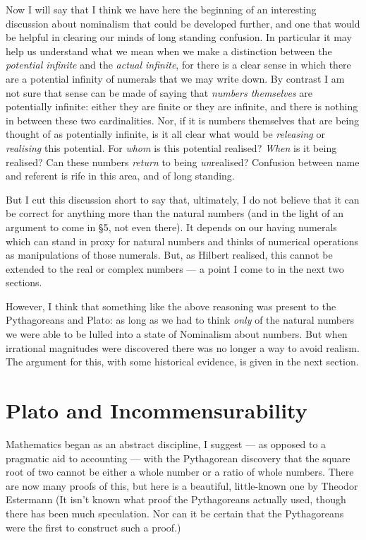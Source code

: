 \documentclass[11pt,oneside,a4paper]{article}
\begin{document}
Now I will say that I think we have here the beginning of an interesting discussion about nominalism that could be developed further, and one that would be helpful in clearing our minds of long standing confusion. In particular it may help us understand what we mean when we make a distinction between the \textit{potential infinite} and the \textit{actual infinite}, for there is a clear sense in which there are a potential infinity of numerals that we may write down. By contrast I am not sure that sense can be made of saying that \textit{numbers themselves} are potentially infinite: either they are finite or they are infinite, and there is nothing in between these two cardinalities. Nor, if it is numbers themselves that are being thought of as potentially infinite, is it all clear what would be \textit{releasing} or \textit{realising} this potential. For \textit{whom} is this potential realised? \textit{When} is it being realised? Can these numbers \textit{return} to being \textit{un}realised? Confusion between name and referent is rife in this area, and of long standing.

But I cut this discussion short to say that, ultimately, I do not believe that it can be correct for anything more than the natural numbers (and in the light of an argument to come in \S 5, not even there). It depends on our having numerals which can stand in proxy for natural numbers and thinks of numerical operations as manipulations of those numerals. But, as Hilbert realised, this cannot be extended to the real or complex numbers --- a point I come to in the next two sections.

However, I think that something like the above reasoning was present to the Pythagoreans and Plato: as long as we had to think \textit{only} of the natural numbers we were able to be lulled into a state of Nominalism about numbers. But when irrational magnitudes were discovered there was no longer a way to avoid realism. The argument for this, with some historical evidence, is given in the next section.




\section{Plato and Incommensurability}

Mathematics began as an abstract discipline, I suggest --- as opposed to a pragmatic aid to accounting --- with the Pythagorean discovery that the square root of two cannot be either a whole number or a ratio of whole numbers. There are now many proofs of this, but here is a beautiful, little-known one by Theodor Estermann \parencite*{estermann_irrationality_1975}%
 (It isn't known what proof the Pythagoreans actually used, though there has been much speculation. Nor can it be certain that the Pythagoreans were the first to construct such a proof.) 
\end{document}
